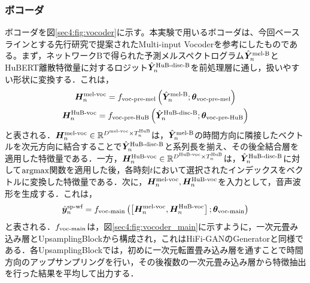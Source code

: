 \subsubsection{ボコーダ}
ボコーダを図\ref{sec4:fig:vocoder}に示す。本実験で用いるボコーダは、今回ベースラインとする先行研究\cite{choi2023intelligible}で提案されたMulti-input Vocoderを参考にしたものである。まず，ネットワークBで得られた予測メルスペクトログラム$\hat{\bm{Y}}^{\text{mel-B}}_{n}$とHuBERT離散特徴量に対するロジット$\hat{\bm{Y}}^{\text{HuB-disc-B}}_{n}$を前処理層に通し，扱いやすい形状に変換する．これは，
\begin{gather}
    \bm{H}^{\text{mel-voc}}_{n} = f_{\text{voc-pre-mel}}\left(\hat{\bm{Y}}^{\text{mel-B}}_{n}; \bm{\theta}_{\text{voc-pre-mel}}\right) \\
    \bm{H}^{\text{HuB-voc}}_{n} = f_{\text{voc-pre-HuB}}\left(\hat{\bm{Y}}^{\text{HuB-disc-B}}_{n}; \bm{\theta}_{\text{voc-pre-HuB}}\right)
\end{gather}
と表される．$\bm{H}^{\text{mel-voc}}_{n} \in \mathbb{R}^{D^{\text{mel-voc}} \times T^{\text{HuB}}_{n}}$は，$\hat{\bm{Y}}^{\text{mel-B}}_{n}$の時間方向に隣接したベクトルを次元方向に結合することで$\hat{\bm{Y}}^{\text{HuB-disc-B}}_{n}$と系列長を揃え、その後全結合層を適用した特徴量である．一方，$\bm{H}^{\text{HuB-voc}}_{n} \in \mathbb{R}^{D^{\text{HuB-voc}} \times T^{\text{HuB}}_{n}}$は，$\hat{\bm{Y}}^{\text{HuB-disc-B}}_{n}$に対して$\text{argmax}$関数を適用した後，各時刻$t$において選択されたインデックスをベクトルに変換した特徴量である．次に，$\bm{H}^{\text{mel-voc}}_{n}, \bm{H}^{\text{HuB-voc}}_{n}$を入力として，音声波形を生成する．これは，
\begin{equation}
    \hat{\bm{y}}^{\text{sp-wf}}_{n} = f_{\text{voc-main}}\left(\left[\bm{H}^{\text{mel-voc}}_{n}, \bm{H}^{\text{HuB-voc}}_{n}\right]; \bm{\theta}_{\text{voc-main}}\right)
\end{equation}
と表される．$f_{\text{voc-main}}$は，図\ref{sec4:fig:vocoder_main}に示すように，一次元畳み込み層とUpsamplingBlockから構成され，これはHiFi-GANのGeneratorと同様である．各UpsamplingBlockでは，初めに一次元転置畳み込み層を通すことで時間方向のアップサンプリングを行い，その後複数の一次元畳み込み層から特徴抽出を行った結果を平均して出力する．

